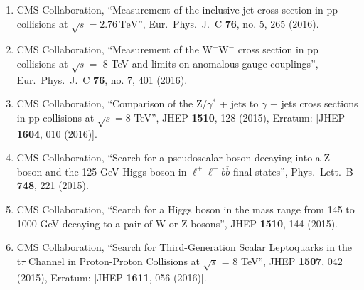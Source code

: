 \begin{itemize}
\begin{enumerate}
\item CMS Collaboration, ``Measurement of the inclusive jet cross section in pp collisions at $\sqrt{s} = 2.76\,\text {TeV}$'', Eur.\ Phys.\ J.\ C {\bf 76}, no. 5, 265 (2016).

\item CMS Collaboration, ``Measurement of the ${{\mathrm{W} }^{+} }\mathrm{W}^{-} $ cross section in pp collisions at $\sqrt{s} =$ 8 TeV and limits on anomalous gauge couplings'', Eur.\ Phys.\ J.\ C {\bf 76}, no. 7, 401 (2016).

\item CMS Collaboration, ``Comparison of the Z/$\gamma$$^{*}$ + jets to $\gamma$ + jets cross sections in pp collisions at $ \sqrt{s}=8 $ TeV'', JHEP {\bf 1510}, 128 (2015), Erratum: [JHEP {\bf 1604}, 010 (2016)].


\item CMS Collaboration, ``Search for a pseudoscalar boson decaying into a Z boson and the 125 GeV Higgs boson in $\ell^+\ell^-b\overline{b}$ final states'', Phys.\ Lett.\ B {\bf 748}, 221 (2015).

\item CMS Collaboration, ``Search for a Higgs boson in the mass range from 145 to 1000 GeV decaying to a pair of W or Z bosons'', JHEP {\bf 1510}, 144 (2015).

\item CMS Collaboration, ``Search for Third-Generation Scalar Leptoquarks in the t$\tau$ Channel in Proton-Proton Collisions at $\sqrt{s}$ = 8 TeV'', JHEP {\bf 1507}, 042 (2015), Erratum: [JHEP {\bf 1611}, 056 (2016)].

\end{enumerate}
\end{itemize}
\fontsize{12pt}{12pt}\selectfont
